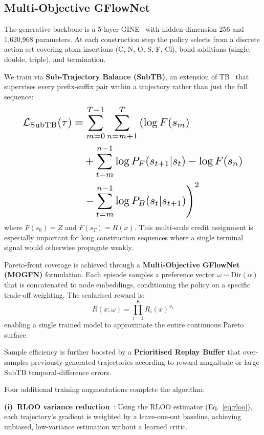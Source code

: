 \documentclass[twocolumn,10pt]{article}
\begin{document}
\subsection{Multi-Objective GFlowNet}
The generative backbone is a 5-layer GINE~\cite{xu2019how} with hidden dimension 256 and
1,620,968 parameters. At each construction step the policy selects from a discrete action
set covering atom insertions (C, N, O, S, F, Cl), bond additions (single, double, triple),
and termination.

We train via \textbf{Sub-Trajectory Balance (SubTB)}, an extension of
TB~\cite{malkin2022trajectory} that supervises every prefix-suffix pair within a trajectory
rather than just the full sequence:
\begin{equation}
\resizebox{0.89\linewidth}{!}{$
\begin{aligned}
\mathcal{L}_\text{SubTB}(\tau) &= \sum_{m=0}^{T-1} \sum_{n=m+1}^{T} \left( \log F(s_m) \right. \\
&\quad + \sum_{t=m}^{n-1} \log P_F(s_{t+1}|s_t) - \log F(s_n) \\
&\quad \left. - \sum_{t=m}^{n-1} \log P_B(s_t|s_{t+1}) \right)^2
\end{aligned}
$}
\end{equation}
where $F(s_0) = Z$ and $F(s_T) = R(x)$. This multi-scale credit assignment is especially
important for long construction sequences where a single terminal signal would otherwise
propagate weakly.

Pareto-front coverage is achieved through a \textbf{Multi-Objective GFlowNet (MOGFN)}
formulation. Each episode samples a preference vector $\omega \sim \text{Dir}(\alpha)$ that
is concatenated to node embeddings, conditioning the policy on a specific trade-off weighting.
The scalarised reward is:
\begin{equation}
R(x; \omega) = \prod_{i=1}^{K} R_i(x)^{\omega_i}
\end{equation}
enabling a single trained model to approximate the entire continuous Pareto surface.

Sample efficiency is further boosted by a \textbf{Prioritised Replay Buffer} that
over-samples previously generated trajectories according to reward magnitude or large SubTB
temporal-difference errors.

Four additional training augmentations complete the algorithm:

\noindent\textbf{(i)~RLOO variance reduction}~\cite{kool2019buy}: Using the RLOO estimator (Eq.~\ref{eq:rloo}), each trajectory's gradient is weighted by a leave-one-out baseline, achieving unbiased, low-variance estimation without a learned critic.
\end{document}
